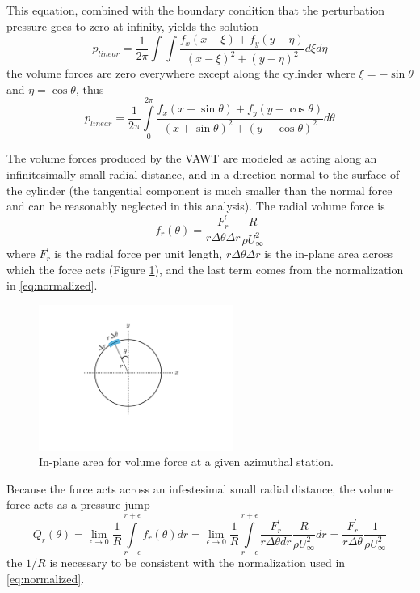 \documentclass{article}
\begin{document}
This equation, combined with the boundary condition that the perturbation pressure goes to zero at infinity, yields the solution
\begin{equation}
p_{linear} = \frac{1}{2\pi}\int\int \frac{f_x(x-\xi) + f_y(y-\eta)}{(x-\xi)^2 + (y-\eta)^2} d\xi d\eta
\end{equation}
the volume forces are zero everywhere except along the cylinder where $\xi = -\sin\theta$ and $\eta = \cos\theta$, thus
\begin{equation}
p_{linear} = \frac{1}{2\pi}\int\limits_0^{2\pi} \frac{f_x(x+\sin\theta) + f_y(y-\cos\theta)}{(x+\sin\theta)^2 + (y-\cos\theta)^2} d\theta
\label{eq:pfxfy}
\end{equation}

The volume forces produced by the VAWT are modeled as acting along an infinitesimally small radial distance, and in a direction normal to the surface of the cylinder (the tangential component is much smaller than the normal force and can be reasonably neglected in this analysis).  The radial volume force is
\begin{equation}
   f_r(\theta) = \frac{F_r^\prime}{r \Delta\theta \Delta r} \frac{R}{\rho U_\infty^2}
\end{equation}
where $F_r^\prime$ is the radial force per unit length, $r \Delta\theta \Delta r$ is the in-plane area across which the force acts (Figure \ref{fig:deltaA}), and the last term comes from the normalization in \eqref{eq:normalized}.

\begin{figure}[htbp]
\begin{center}
\includegraphics[width=2.5in]{images/deltaA}
\caption{In-plane area for volume force at a given azimuthal station.}
\label{fig:deltaA}
\end{center}
\end{figure}

Because the force acts across an infestesimal small radial distance, the volume force acts as a pressure jump
\begin{equation}
  Q_r(\theta) = \lim_{\epsilon \rightarrow 0} \frac{1}{R} \int\limits_{r-\epsilon}^{r+\epsilon} f_r(\theta) dr = \lim_{\epsilon \rightarrow 0} \frac{1}{R} \int\limits_{r-\epsilon}^{r+\epsilon}\frac{F_r^\prime}{r \Delta\theta dr} \frac{R}{\rho U_\infty^2} dr = \frac{F_r^\prime}{r \Delta\theta} \frac{1}{\rho U_\infty^2}
  \label{eq:Qr}
\end{equation}
 the $1/R$ is necessary to be consistent with the normalization used in \eqref{eq:normalized}.
\end{document}
